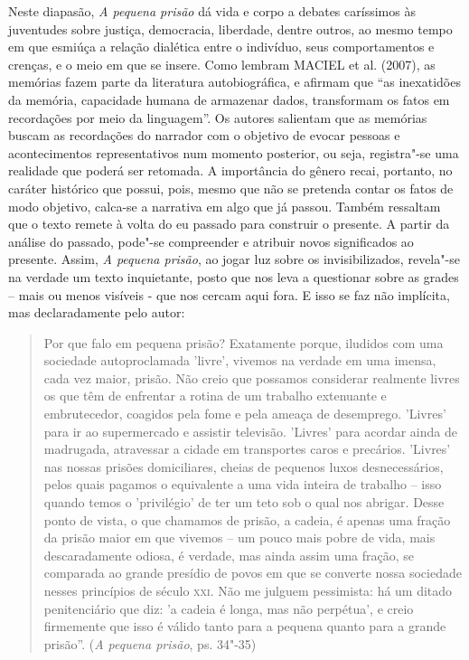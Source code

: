 \documentclass[11pt]{extarticle}
\begin{document}
Neste diapasão, \emph{A pequena prisão} dá vida e corpo a debates
caríssimos às juventudes sobre justiça, democracia, liberdade, dentre
outros, ao mesmo tempo em que esmiúça a relação dialética entre o
indivíduo, seus comportamentos e crenças, e o meio em que se insere.
Como lembram MACIEL et al. (2007), as memórias fazem parte da literatura
autobiográfica, e afirmam que ``as inexatidões da memória, capacidade
humana de armazenar dados, transformam os fatos em recordações por meio
da linguagem''. Os autores salientam que as memórias buscam as
recordações do narrador com o objetivo de evocar pessoas e
acontecimentos representativos num momento posterior, ou seja,
registra"-se uma realidade que poderá ser retomada. A importância do
gênero recai, portanto, no caráter histórico que possui, pois, mesmo que
não se pretenda contar os fatos de modo objetivo, calca-se a narrativa
em algo que já passou. Também ressaltam que o texto remete à volta do eu
passado para construir o presente. A partir da análise do passado,
pode"-se compreender e atribuir novos significados ao presente. Assim,
\emph{A
pequena prisão}, ao jogar luz sobre os invisibilizados, revela"-se
na verdade um texto inquietante, posto que nos leva a questionar sobre as
grades -- mais ou menos visíveis - que nos cercam aqui fora. E isso se
faz não implícita, mas declaradamente pelo autor:

\begin{quote}
Por que falo em pequena prisão? Exatamente porque, iludidos com
uma sociedade autoproclamada 'livre', vivemos na verdade em uma
imensa, cada vez maior, prisão. Não creio que possamos considerar
realmente livres os que têm de enfrentar a rotina de um trabalho
extenuante e embrutecedor, coagidos pela fome e pela ameaça de
desemprego. 'Livres' para ir ao supermercado e assistir televisão.
'Livres' para acordar ainda de madrugada, atravessar a cidade em
transportes caros e precários. 'Livres' nas nossas prisões
domiciliares, cheias de pequenos luxos desnecessários, pelos quais
pagamos o equivalente a uma vida inteira de trabalho -- isso quando
temos o 'privilégio' de ter um teto sob o qual nos abrigar. Desse
ponto de vista, o que chamamos de prisão, a cadeia, é apenas uma fração
da prisão maior em que vivemos -- um pouco mais pobre de vida, mais
descaradamente odiosa, é verdade, mas ainda assim uma fração, se
comparada ao grande presídio de povos em que se converte nossa sociedade
nesses princípios de século \textsc{xxi}. Não me julguem pessimista: há um ditado
penitenciário que diz: 'a cadeia é longa, mas não perpétua', e creio
firmemente que isso é válido tanto para a pequena quanto para a grande
prisão''. (\emph{A
pequena prisão}, ps. 34"-35)
\end{quote}
\end{document}

